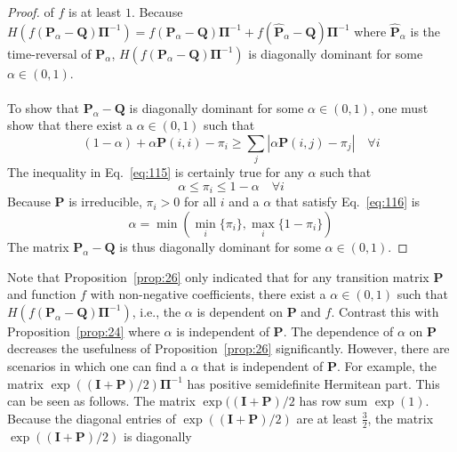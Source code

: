 \begin{proof}
  of $f$ is at least $1$. Because $H(f(\mathbf{P}_{\alpha} -
  \mathbf{Q})\bm{\Pi}^{-1}) = f(\mathbf{P}_{\alpha} -
  \mathbf{Q})\bm{\Pi}^{-1} + f(\hat{\mathbf{P}}_{\alpha} -
  \mathbf{Q})\bm{\Pi}^{-1}$ where $\hat{\mathbf{P}}_{\alpha}$ is the
  time-reversal of $\mathbf{P}_{\alpha}$,
  $H(f(\mathbf{P}_{\alpha} - \mathbf{Q})\bm{\Pi}^{-1})$ is diagonally dominant for some $\alpha \in (0,1)$. \\ \\
  \noindent To show that $\mathbf{P}_{\alpha} - \mathbf{Q}$ is
  diagonally dominant for some $\alpha \in (0,1)$, one must show
  that there exist a $\alpha \in (0,1)$ such
  that 
  \begin{equation} 
    \label{eq:115} 
    (1 - \alpha) + \alpha
    \mathbf{P}(i,i) - \pi_i \geq \sum_{j}|\alpha \mathbf{P}(i,j) -
    \pi_j| \quad \forall i 
  \end{equation}
  The inequality in Eq.~\eqref{eq:115} is certainly true for any
  $\alpha$ such that
  \begin{equation}
    \label{eq:116} \alpha \leq \pi_i \leq 1 - \alpha \quad \forall i 
  \end{equation} 
  Because $\mathbf{P}$ is irreducible, $\pi_i > 0$ for all $i$ and a
  $\alpha$ that satisfy Eq.~\eqref{eq:116} is 
  \begin{equation}
    \label{eq:117} \alpha = \min( \min_{i}\{ \pi_i \}, \max_{i} \{1 -
    \pi_i \}) 
  \end{equation} 
  The matrix $\mathbf{P}_{\alpha} - \mathbf{Q}$ is thus diagonally
  dominant for some $\alpha \in (0,1)$.  
\end{proof} 
Note that Proposition~\ref{prop:26} only indicated that for any
transition matrix $\mathbf{P}$ and function $f$ with non-negative
coefficients, there exist a $\alpha \in (0,1)$ such that
$H(f(\mathbf{P}_{\alpha} - \mathbf{Q})\bm{\Pi}^{-1})$, i.e., the
$\alpha$ is dependent on $\mathbf{P}$ and $f$. Contrast this with
Proposition~\ref{prop:24} where $\alpha$ is independent of
$\mathbf{P}$. The dependence of $\alpha$ on $\mathbf{P}$ decreases the
usefulness of Proposition~\ref{prop:26} significantly. However, there
are scenarios in which one can find a $\alpha$ that is independent of
$\mathbf{P}$. For example, the matrix $\exp((\mathbf{I} +
\mathbf{P})/2)\bm{\Pi}^{-1}$ has positive semidefinite Hermitean
part. This can be seen as follows. The matrix $\exp((\mathbf{I} +
\mathbf{P})/2$ has row sum $\exp(1)$. Because the diagonal entries of
$\exp((\mathbf{I} + \mathbf{P})/2)$ are at least $\tfrac{3}{2}$, the
matrix $\exp((\mathbf{I} + \mathbf{P})/2)$ is diagonally
